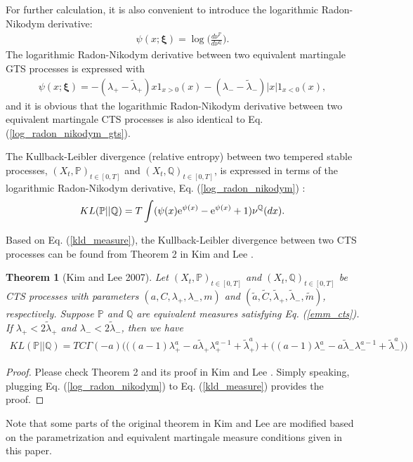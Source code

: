 \documentclass[preprint,11pt]{amsart}
\newtheorem{thm}{Theorem}
\begin{document}
	For further calculation, it is also convenient to introduce the logarithmic Radon-Nikodym derivative:
	\begin{align}
	\label{log_radon_nikodym}
		\psi(x;\boldsymbol{\xi})=\log{\Bigg(\frac{d\nu^\mathbb{P}}{d\nu^\mathbb{Q}}\Bigg)}.
	\end{align}
	The logarithmic Radon-Nikodym derivative between two equivalent martingale GTS processes is expressed with
	\begin{align}
	\label{log_radon_nikodym_gts}
		\psi(x;\boldsymbol{\xi})=-(\lambda_+-\tilde{\lambda}_+)x 1_{x>0}(x)-(\lambda_{-}-\tilde{\lambda}_{-})|x| 1_{x<0}(x),
	\end{align}
	and it is obvious that the logarithmic Radon-Nikodym derivative between two equivalent martingale CTS processes is also identical to Eq. (\ref{log_radon_nikodym_gts}).
	
	The Kullback-Leibler divergence (relative entropy) between two tempered stable processes, $(X_t, \mathbb{P})_{t\in[0,T]}$ and $(X_t, \mathbb{Q})_{t\in[0,T]}$, is expressed in terms of the logarithmic Radon-Nikodym derivative, Eq. (\ref{log_radon_nikodym}) \cite{cont2004nonparametric, kim2007relative}:
	\begin{align}
	\label{kld_measure}
		KL(\mathbb{P}||\mathbb{Q})=T\int (\psi(x){\rm e}^{\psi(x)}-{\rm e}^{\psi(x)}+1)\nu^\mathbb{Q}(dx).
	\end{align}
	
	Based on Eq. (\ref{kld_measure}), the Kullback-Leibler divergence between two CTS processes can be found from Theorem 2 in Kim and Lee \cite{kim2007relative}.
	\begin{thm}[Kim and Lee 2007]
		Let $(X_t, \mathbb{P})_{t\in[0,T]}$ and $(X_t, \mathbb{Q})_{t\in[0,T]}$ be CTS processes with parameters $(a, C, \lambda_+, \lambda_-, m)$ and $(\tilde{a}, \tilde{C}, \tilde{\lambda}_{+}, \tilde{\lambda}_{-}, \tilde{m})$, respectively. Suppose $\mathbb{P}$ and $\mathbb{Q}$ are equivalent measures satisfying Eq. (\ref{emm_cts}). If $\lambda_{+}<2\tilde{\lambda}_{+}$ and $\lambda_{-}<2\tilde{\lambda}_{-}$, then we have
		\begin{align}
		\label{kld_cts}
			KL(\mathbb{P}||\mathbb{Q})=TC\Gamma(-a)\Big(\big((a-1)\lambda_+^{a}-a\tilde{\lambda}_{+}\lambda_+^{a-1}+\tilde{\lambda}_{+}^a\big)+\big((a-1)\lambda_-^{a}-a\tilde{\lambda}_{-}\lambda_-^{a-1}+\tilde{\lambda}_{-}^a\big)\Big)
		\end{align}
	\end{thm}
	\begin{proof}
		Please check Theorem 2 and its proof in Kim and Lee \cite{kim2007relative}. Simply speaking, plugging Eq. (\ref{log_radon_nikodym}) to Eq. (\ref{kld_measure}) provides the proof.
	\end{proof}
	Note that some parts of the original theorem in Kim and Lee \cite{kim2007relative} are modified based on the parametrization and equivalent martingale measure conditions given in this paper.
	
\end{document}
